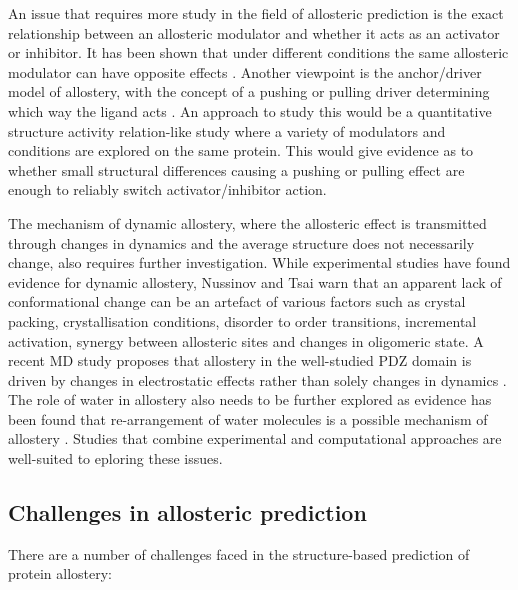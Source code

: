 An issue that requires more study in the field of allosteric prediction is the exact relationship between an allosteric modulator and whether it acts as an activator or inhibitor.
It has been shown that under different conditions the same allosteric modulator can have opposite effects \cite{Motlagh2012}.
Another viewpoint is the anchor/driver model of allostery, with the concept of a pushing or pulling driver determining which way the ligand acts \cite{Nussinov2014}.
An approach to study this would be a quantitative structure activity relation-like study where a variety of modulators and conditions are explored on the same protein.
This would give evidence as to whether small structural differences causing a pushing or pulling effect are enough to reliably switch activator/inhibitor action.

The mechanism of dynamic allostery, where the allosteric effect is transmitted through changes in dynamics and the average structure does not necessarily change, also requires further investigation.
While experimental studies \cite{Popovych2006, Capdevila2017, Wellington2017} have found evidence for dynamic allostery, Nussinov and Tsai \cite{Nussinov2015} warn that an apparent lack of conformational change can be an artefact of various factors such as crystal packing, crystallisation conditions, disorder to order transitions, incremental activation, synergy between allosteric sites and changes in oligomeric state.
A recent MD study proposes that allostery in the well-studied PDZ domain is driven by changes in electrostatic effects rather than solely changes in dynamics \cite{Kumawat2017, Liu2017}.
The role of water in allostery also needs to be further explored as evidence has been found that re-arrangement of water molecules is a possible mechanism of allostery \cite{Buchli2013, Amor2016}.
Studies that combine experimental and computational approaches \cite{Haselbach2017, Ozorowski2017} are well-suited to eploring these issues.


\subsection{Challenges in allosteric prediction}

There are a number of challenges faced in the structure-based prediction of protein allostery:

